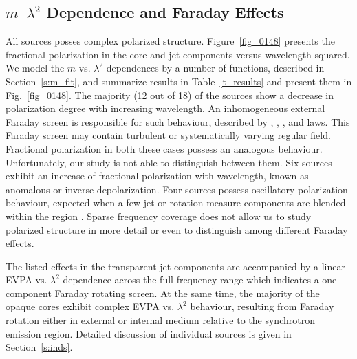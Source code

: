 \documentclass[a4paper,fleqn,usenatbib,useAMS]{mnras}
\begin{document}
\subsection{$m$--$\lambda^2$ Dependence and Faraday Effects}
\label{s:res_m}

All sources posses complex polarized structure. 
Figure~\ref{fig_0148} presents the fractional polarization in the core and jet components versus wavelength squared. 
We model the $m$ vs. $\lambda^2$ dependences by a number of functions, described in Section~\ref{s:m_fit}, and summarize results in Table~\ref{t_results} and present them in Fig.~\ref{fig_0148}.
The majority (12 out of 18) of the sources show a decrease in polarization degree with increasing wavelength. 
An inhomogeneous external Faraday screen is responsible for such behaviour, described by \citet{burn66}, \citet{tribble91}, \citet{2008AA...487..865R}, and \citet{2009AA...502...61M} laws.
This Faraday screen may contain turbulent or systematically varying regular field. Fractional polarization in both these cases possess an analogous behaviour. Unfortunately, our study is not able to distinguish between them.
Six sources exhibit an increase of fractional polarization with wavelength, known as anomalous \citep{sokoloff_etal98} or inverse \citep{homan_12} depolarization.
Four sources possess oscillatory polarization behaviour, expected when a few jet or rotation measure components are blended within the region \citep{conway_etal_74,gl_84}.
Sparse frequency coverage does not allow us to study polarized structure in more detail or even to distinguish among different Faraday effects. 

The listed effects in the transparent jet components are accompanied by a linear EVPA vs. $\lambda^2$ dependence across the full frequency range which indicates a one-component Faraday rotating screen.
At the same time, the majority of the opaque cores exhibit complex EVPA vs. $\lambda^2$ behaviour, resulting from Faraday rotation either in external or internal medium relative to the synchrotron emission region. 
Detailed discussion of individual sources is given in Section~\ref{s:inds}.
\end{document}
